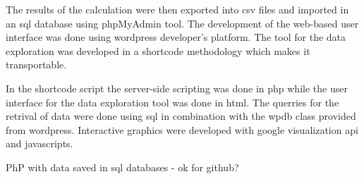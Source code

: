 The results of the calculation were then exported into csv files and imported
in an sql database using phpMyAdmin tool. The development of the web-based user interface was done using wordpress developer's platform. The tool for the data exploration was developed in a shortcode methodology
which makes it transportable.

In the shortcode script the server-side scripting was done in php while the user interface for the data exploration tool was done in html. The querries for the retrival of data were done using sql in combination with the wpdb class provided from wordpress. Interactive graphics were developed with google visualization api and javascripts.

PhP with data saved in sql databases - ok for github?
